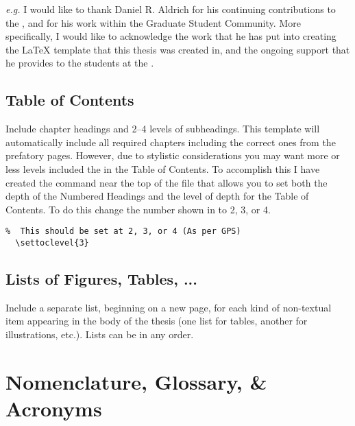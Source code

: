 			\textit{e.g. } I would like to thank Daniel R. Aldrich for his continuing contributions to the \UofA, and for his work within the Graduate Student Community. More specifically, I would like to acknowledge the work that he has put into creating the \LaTeX{} template that this thesis was created in, and the ongoing support that he provides to the students at the \UofA.

		\subsection{Table of Contents}\label{toc}
			Include chapter headings and 2--4 levels of subheadings. 
			This template will automatically include all required chapters including the correct ones from the prefatory pages.
			However, due to stylistic considerations you may want more or less levels included the in the Table of Contents.
			To accomplish this I have created the command near the top of the  file that allows you to set both the depth of the Numbered Headings and the level of depth for the Table of Contents.
			To do this change the number shown in  to 2, 3, or 4.
			\begin{lstlisting}[float=ht,caption=Set Numbered Heading and ToC Level,label=lst:tocLevels,style=LaTeXStyle,basicstyle=\scriptsize\ttfamily,]
% Option to change the Level of subheading included in the Table of Contents
%  This should be set at 2, 3, or 4 (As per GPS)
  \settoclevel{3}
			\end{lstlisting}


		\subsection{Lists of Figures, Tables, ...}\label{listsof}
			Include a separate list, beginning on a new page, for each kind of non-textual item appearing in the body of the thesis (one list for tables, another for illustrations, etc.). 
			Lists can be in any order.  

	\section{Nomenclature, Glossary, \& Acronyms}\label{nomenclature}\label{glossary}\label{acronyms}
